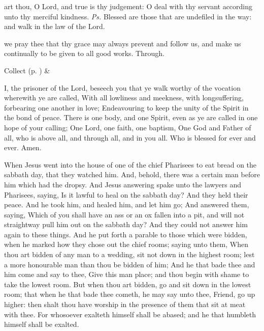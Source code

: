 
\introit
{} art thou, O Lord, and true is thy judgement: O deal with thy servant according unto thy merciful kindness. \textit{Ps.} Blessed are those that are undefiled in the way: and walk in the law of the Lord.

\collect
{} we pray thee that thy grace may always prevent and follow us, and make us continually to be given to all good works. Through.


\begin{rubric}
     Collect  (p. \pageref{SPSaints}) \&  
\end{rubric}

 I, the prisoner of the Lord, beseech you that ye walk worthy of the vocation wherewith ye are called, With all lowliness and meekness, with longsuffering, forbearing one another in love; Endeavouring to keep the unity of the Spirit in the bond of peace. There is one body, and one Spirit, even as ye are called in one hope of your calling; One Lord, one faith, one baptism, One God and Father of all, who is above all, and through all, and in you all. Who is blessed for ever and ever. Amen.


 When Jesus went into the house of one of the chief Pharisees to eat bread on the sabbath day, that they watched him. And, behold, there was a certain man before him which had the dropsy. And Jesus answering spake unto the lawyers and Pharisees, saying, Is it lawful to heal on the sabbath day? And they held their peace. And he took him, and healed him, and let him go; And answered them, saying, Which of you shall have an ass or an ox fallen into a pit, and will not straightway pull him out on the sabbath day? And they could not answer him again to these things. And he put forth a parable to those which were bidden, when he marked how they chose out the chief rooms; saying unto them, When thou art bidden of any man to a wedding, sit not down in the highest room; lest a more honourable man than thou be bidden of him; And he that bade thee and him come and say to thee, Give this man place; and thou begin with shame to take the lowest room. But when thou art bidden, go and sit down in the lowest room; that when he that bade thee cometh, he may say unto thee, Friend, go up higher: then shalt thou have worship in the presence of them that sit at meat with thee. For whosoever exalteth himself shall be abased; and he that humbleth himself shall be exalted.

